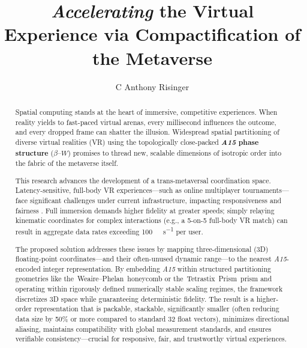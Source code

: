 \documentclass[10pt]{article}
\def\AAAB{\textit{A15}}
\def\betaW{$\beta$--$W$}
\def\WP{Weaire--Phelan}
\def\TSP{Tetrastix~Prism}
\def\tWPh{the~\WP{}~honeycomb}
\def\tTSp{the~\TSP{}~prism}
\def\IL{Infima~Labs}
\begin{document}

\begin{opening}


    \author[%
        \IL{}, \URL{https://infima.space}, e-mail: \URL{anthony@infima.space}\\
        Snap Game Services, \URL{https://snap.gs}, e-mail: \URL{anthony@snap.gs}
    ]{C Anthony Risinger}


    \title{%
        \emph{Accelerating} {\normalsize the} Virtual Experience\newline{}
        {\normalsize via} Compactification {\normalsize of the} Metaverse
    }


    \begin{abstract}
        \setlength{\parindent}{0em}
        \setlength{\parskip}{1em}

        Spatial computing stands at the heart of immersive, competitive experiences. When reality yields to fast-paced virtual arenas, every millisecond influences the outcome, and every dropped frame can shatter the illusion. Widespread spatial partitioning of diverse virtual realities (VR) using the topologically close-packed \textbf{\AAAB{} phase structure} (\betaW{}) promises to thread new, scalable dimensions of isotropic order into the fabric of the metaverse itself.

        This research advances the development of a trans-metaversal coordination space. Latency-sensitive, full-body VR experiences---such as online multiplayer tournaments---face significant challenges under current infrastructure, impacting responsiveness and fairness \cite{Claypool2006}. Full immersion demands higher fidelity at greater speeds; simply relaying kinematic coordinates for complex interactions (e.g., a 5-on-5 full-body VR match) can result in aggregate data rates exceeding \SI{100}{\kilo\bit\per\second} per user.

        The proposed solution addresses these issues by mapping three-dimensional (3D) floating-point coordinates---and their often-unused dynamic range---to the nearest \AAAB{}-encoded integer representation. By embedding \AAAB{} within structured partitioning geometries like \tWPh{} or \tTSp{} and operating within rigorously defined numerically stable scaling regimes, the framework discretizes 3D space while guaranteeing deterministic fidelity. The result is a higher-order representation that is packable, stackable, significantly smaller (often reducing data size by 50\% or more compared to standard \SI{32}{\bit} float vectors), minimizes directional aliasing, maintains compatibility with global measurement standards, and ensures verifiable consistency---crucial for responsive, fair, and trustworthy virtual experiences.


\end{abstract}
\end{opening}
\end{document}
